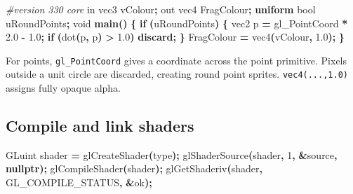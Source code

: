 \documentclass[
  10pt,
  a4paper,
]{article}
\newenvironment{Shaded}{\begin{snugshade}}{\end{snugshade}}
\newcommand{\BuiltInTok}[1]{#1}
\newcommand{\DataTypeTok}[1]{\textcolor[rgb]{0.13,0.29,0.53}{#1}}
\newcommand{\DecValTok}[1]{\textcolor[rgb]{0.00,0.00,0.81}{#1}}
\newcommand{\FloatTok}[1]{\textcolor[rgb]{0.00,0.00,0.81}{#1}}
\newcommand{\FunctionTok}[1]{\textcolor[rgb]{0.13,0.29,0.53}{\textbf{#1}}}
\newcommand{\KeywordTok}[1]{\textcolor[rgb]{0.13,0.29,0.53}{\textbf{#1}}}
\newcommand{\NormalTok}[1]{#1}
\newcommand{\OperatorTok}[1]{\textcolor[rgb]{0.81,0.36,0.00}{\textbf{#1}}}
\newcommand{\PreprocessorTok}[1]{\textcolor[rgb]{0.56,0.35,0.01}{\textit{#1}}}
\begin{document}
\begin{Shaded}
\begin{Highlighting}[]
\PreprocessorTok{\#version 330 core}
\DataTypeTok{in} \DataTypeTok{vec3}\NormalTok{ vColour}\OperatorTok{;}
\DataTypeTok{out} \DataTypeTok{vec4}\NormalTok{ FragColour}\OperatorTok{;}
\KeywordTok{uniform} \DataTypeTok{bool}\NormalTok{ uRoundPoints}\OperatorTok{;}
\DataTypeTok{void} \FunctionTok{main}\OperatorTok{()} \OperatorTok{\{}
    \KeywordTok{if} \OperatorTok{(}\NormalTok{uRoundPoints}\OperatorTok{)} \OperatorTok{\{}
        \DataTypeTok{vec2}\NormalTok{ p }\OperatorTok{=} \BuiltInTok{gl\_PointCoord} \OperatorTok{*} \FloatTok{2.0} \OperatorTok{{-}} \FloatTok{1.0}\OperatorTok{;}
        \KeywordTok{if} \OperatorTok{(}\BuiltInTok{dot}\OperatorTok{(}\NormalTok{p}\OperatorTok{,}\NormalTok{ p}\OperatorTok{)} \OperatorTok{\textgreater{}} \FloatTok{1.0}\OperatorTok{)} \KeywordTok{discard}\OperatorTok{;}
    \OperatorTok{\}}
\NormalTok{    FragColour }\OperatorTok{=} \DataTypeTok{vec4}\OperatorTok{(}\NormalTok{vColour}\OperatorTok{,} \FloatTok{1.0}\OperatorTok{);}
\OperatorTok{\}}
\end{Highlighting}
\end{Shaded}

For points, \texttt{gl\_PointCoord} gives a coordinate across the point
primitive. Pixels outside a unit circle are discarded, creating round
point sprites. \texttt{vec4(...,1.0)} assigns fully opaque alpha.

\subsection{Compile and link shaders}\label{compile-and-link-shaders}

\begin{Shaded}
\begin{Highlighting}[]
\NormalTok{GLuint shader }\OperatorTok{=}\NormalTok{ glCreateShader}\OperatorTok{(}\NormalTok{type}\OperatorTok{);}
\NormalTok{glShaderSource}\OperatorTok{(}\NormalTok{shader}\OperatorTok{,} \DecValTok{1}\OperatorTok{,} \OperatorTok{\&}\NormalTok{source}\OperatorTok{,} \KeywordTok{nullptr}\OperatorTok{);}
\NormalTok{glCompileShader}\OperatorTok{(}\NormalTok{shader}\OperatorTok{);}
\NormalTok{glGetShaderiv}\OperatorTok{(}\NormalTok{shader}\OperatorTok{,}\NormalTok{ GL\_COMPILE\_STATUS}\OperatorTok{,} \OperatorTok{\&}\NormalTok{ok}\OperatorTok{);}
\end{Highlighting}
\end{Shaded}
\end{document}

